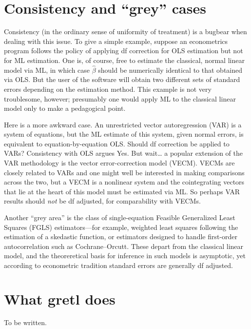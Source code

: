 \section{Consistency and ``grey'' cases}

Consistency (in the ordinary sense of uniformity of treatment) is a
bugbear when dealing with this issue.  To give a simple example,
suppose an econometrics program follows the policy of applying df
correction for OLS estimation but not for ML estimation.  One is, of
course, free to estimate the classical, normal linear model via ML, in
which case $\hat\beta$ should be numerically identical to that
obtained via OLS.  But the user of the software will obtain two
different sets of standard errors depending on the estimation method.
This example is not very troublesome, however; presumably one would
apply ML to the classical linear model only to make a pedagogical
point.

Here is a more awkward case.  An unrestricted vector autoregression
(VAR) is a system of equations, but the ML estimate of this system,
given normal errors, is equivalent to equation-by-equation OLS.
Should df correction be applied to VARs? Consistency with OLS argues
Yes. But wait\dots{} a popular extension of the VAR methodology is the
vector error-correction model (VECM).  VECMs are closely related to
VARs and one might well be interested in making comparisons across the
two, but a VECM is a nonlinear system and the cointegrating vectors
that lie at the heart of this model must be estimated via ML.  So
perhaps VAR results should \textit{not} be df adjusted, for
comparability with VECMs.

Another ``grey area'' is the class of single-equation Feasible
Generalized Least Squares (FGLS) estimators---for example, weighted
least squares following the estimation of a skedastic function, or
estimators designed to handle first-order autocorrelation such as
Cochrane--Orcutt.  These depart from the classical linear model, and
the theoreretical basis for inference in such models is asymptotic,
yet according to econometric tradition standard errors are generally
df adjusted.


\section{What gretl does}

To be written.
